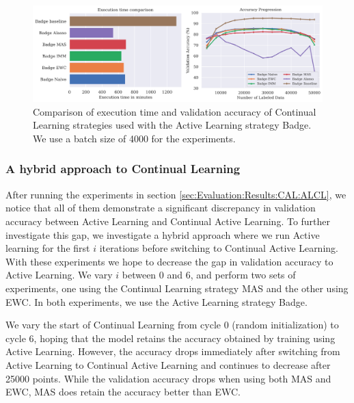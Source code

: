 \begin{figure}[h]
    \centering
    \includegraphics[width=\linewidth]{images/results_CAL/Badge_CAL_4000b.png}
    \caption[Continual Active Learning Badge 4000 batch size]{Comparison of execution time and validation accuracy of Continual Learning strategies used with the Active Learning strategy
    Badge. We use a batch size of 4000 for the experiments.}
    \label{fig:Evaluation:Results:CAL:Badge4000}
\end{figure}

\subsubsection{A hybrid approach to Continual Learning}
\label{sec:Evaluation:Results:CAL:Hybrid}
After running the experiments in section \ref{sec:Evaluation:Results:CAL:ALCL}, we notice that all of them demonstrate a significant discrepancy in validation accuracy between Active Learning and Continual Active Learning. To further investigate this gap,
we investigate a hybrid approach where we run Active learning for the first $i$ iterations before switching to Continual Active Learning. With these experiments we hope to decrease the gap in validation accuracy to Active Learning. We vary $i$ between 0 and 6,
and perform two sets of experiments, one using the Continual Learning strategy MAS and the other using EWC. In both experiments, we use the Active Learning strategy Badge.

We vary the start of Continual Learning from 
    cycle 0 (random initialization) to cycle 6, hoping that the model retains the accuracy obtained by training using Active Learning. However, the accuracy drops immediately after switching
    from Active Learning to Continual Active Learning and continues to decrease after 25000 points. While the validation accuracy drops when using both MAS and EWC, MAS does retain the accuracy
    better than EWC.

